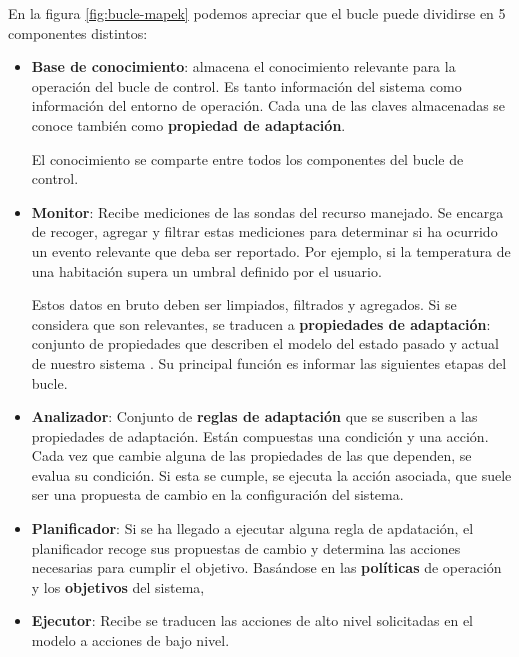 En la figura \ref{fig:bucle-mapek} podemos apreciar que el bucle puede dividirse en 5 componentes distintos: \cite{ibmcorporationArchitecturalBlueprintAutonomic2006}

\begin{itemize}
  \item \textbf{Base de conocimiento}: almacena el conocimiento relevante para la operación del bucle de control. Es tanto información del sistema como información del entorno de operación. Cada una de las claves almacenadas se conoce también como \textbf{propiedad de adaptación}.

  El conocimiento se comparte entre todos los componentes del bucle de control.

  \item \textbf{Monitor}: Recibe mediciones de las sondas del recurso manejado. Se encarga de recoger, agregar y filtrar estas mediciones para determinar si ha ocurrido un evento relevante que deba ser reportado. Por ejemplo, si la temperatura de una habitación supera un umbral definido por el usuario.

  Estos datos en bruto deben ser limpiados, filtrados y agregados. Si se considera que son relevantes, se traducen a \textbf{propiedades de adaptación}: conjunto de propiedades que describen el modelo del estado pasado y actual de nuestro sistema \cite{garlanIncreasingSystemDependability2003}. Su principal función es informar las siguientes etapas del bucle.

  \item \textbf{Analizador}: Conjunto de \textbf{reglas de adaptación} que se suscriben a las propiedades de adaptación. Están compuestas una condición y una acción. Cada vez que cambie alguna de las propiedades de las que dependen, se evalua su condición. Si esta se cumple, se ejecuta la acción asociada, que suele ser una propuesta de cambio en la configuración del sistema.

  \item \textbf{Planificador}: Si se ha llegado a ejecutar alguna regla de apdatación, el planificador recoge sus propuestas de cambio y determina las acciones necesarias para cumplir el objetivo. Basándose en las \textbf{políticas} de operación y los \textbf{objetivos} del sistema,

  \item \textbf{Ejecutor}: Recibe se traducen las acciones de alto nivel solicitadas en el modelo a acciones de bajo nivel.
\end{itemize}
